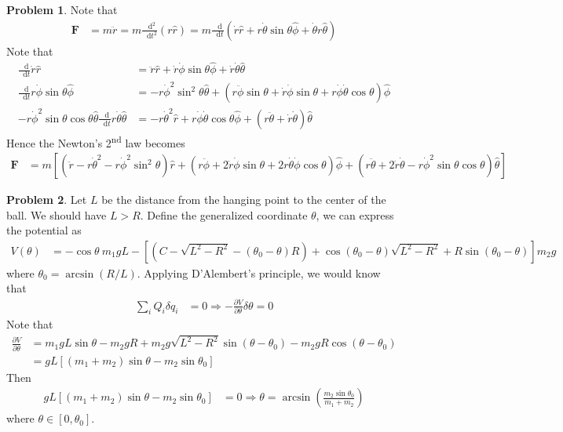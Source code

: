 \documentclass[twoside,11pt]{article}
\newcommand{\lms}{\fontfamily{lmss}\selectfont} %
\renewcommand*\d{\mathop{}\!\mathrm{d}}
\theoremstyle{definition}
\newtheorem{problem}{\lms Problem}
\theoremstyle{remark}
\begin{document}
\begin{problem}
Note that
\begin{align*}
    \mathbf{F} 
    &= m\ddot{r}
    = m\frac{\d^2}{\d t^2}(r\hat{r})
    = m\frac{\d}{\d t}(\dot{r}\hat{r} + r\dot{\theta}\sin\theta\hat{\phi} + \dot{\theta}r\hat{\theta})
\end{align*}
Note that
\begin{align*}
    \frac{\d}{\d t}\dot{r}\hat{r} 
    &= \ddot{r}\hat{r} + \dot{r}\dot{\phi}\sin\theta\hat{\phi}
    + \dot{r}\dot{\theta}\hat{\theta}\\
    \frac{\d}{\d t}r\dot{\phi}\sin\theta\hat{\phi} &= 
    -r\dot{\phi}^2\sin^2\theta\hat{\theta}
    +(r\ddot{\phi}\sin\theta + \dot{r}\dot{\phi}\sin\theta 
    + r\dot{\phi}\dot{\theta}\cos\theta)\hat{\phi}\\
    - r\dot{\phi}^2\sin\theta\cos\theta\hat{\theta}
    \frac{\d}{\d t}r\dot{\theta}\hat{\theta} &= 
    -r\dot{\theta}^2\hat{r} + r\dot{\phi}\dot{\theta}\cos\theta\hat{\phi}
    + (r\ddot{\theta} + \dot{r}\dot{\theta})\hat{\theta}
\end{align*}
Hence the Newton's 2\textsuperscript{nd} law becomes
\begin{align*}
    \mathbf{F} &= m[
    (\ddot{r} - r\dot{\theta}^2 - r\dot{\phi}^2\sin^2\theta)\hat{r}
    + (r\ddot{\phi} + 2\dot{r}\dot{\phi}\sin\theta + 2r\dot{\theta}\dot{\phi}\cos\theta)\hat{\phi}
    + (r\ddot{\theta} + 2\dot{r}\dot{\theta} - r\dot{\phi}^2\sin\theta\cos\theta)\hat{\theta}]
\end{align*}

\end{problem}


\begin{problem}
Let $L$ be the distance from the hanging point to the center of the ball.
We should have $L>R$.
Define the generalized coordinate $\theta$, we can express the potential as 
\begin{align*}
    V(\theta) &= -\cos\theta\ m_1 gL - 
    [(C-\sqrt{L^2-R^2} - (\theta_0-\theta)R)
    +\cos(\theta_0-\theta)\sqrt{L^2-R^2}
    + R\sin(\theta_0-\theta)
    ]m_2g
\end{align*}
where $\theta_0=\arcsin(R/L)$.
Applying D'Alembert's principle, we would know that
\begin{align*}
    \sum_i Q_i\delta q_i &= 0 \Rightarrow
    -\frac{\partial V}{\partial \theta}\delta\theta = 0
\end{align*}
Note that
\begin{align*}
    \frac{\partial V}{\partial\theta} &= 
    m_1 gL\sin\theta - m_2gR + m_2g\sqrt{L^2-R^2}\sin(\theta-\theta_0) - m_2 gR\cos(\theta-\theta_0)\\
    &= gL[(m_1+m_2)\sin\theta - m_2\sin\theta_0]
\end{align*}
Then 
\begin{align*}
    gL[(m_1+m_2)\sin\theta - m_2\sin\theta_0] &= 0
    \Rightarrow \theta = \arcsin\left(\frac{m_2\sin\theta_0}{m_1+m_2}\right)
\end{align*}
where $\theta\in[0, \theta_0]$.
\end{problem}
\end{document}
